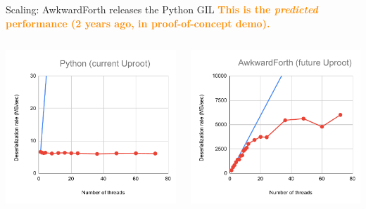 \documentclass[aspectratio=169]{beamer}
\begin{document}
\begin{frame}{Scaling: AwkwardForth releases the Python GIL}
\vspace{0.25 cm}
\textcolor{darkorange}{\bf \centering This is the {\it predicted} performance (2 years ago, in proof-of-concept demo).}

\begin{columns}
\includegraphics[width=\linewidth]{PLOTS/Python-scaling.pdf}

\includegraphics[width=\linewidth]{PLOTS/AwkwardForth-scaling.pdf}
\end{columns}
\end{frame}
\end{document}
